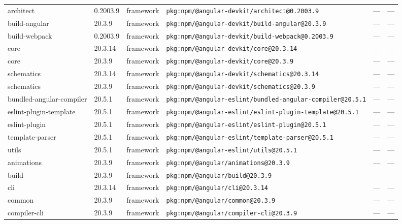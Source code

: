 \documentclass[11pt,a4paper]{article}
\begin{document}
\begin{longtable}{|p{4cm}|p{2cm}|p{1.6cm}|p{5cm}|p{1.5cm}|p{3.5cm}|}
\raggedright architect & 0.2003.9 & framework & \small\texttt{pkg:npm/@angular-devkit/architect@0.2003.9} & — & \small — \\
\raggedright build-angular & 20.3.9 & framework & \small\texttt{pkg:npm/@angular-devkit/build-angular@20.3.9} & — & \small — \\
\raggedright build-webpack & 0.2003.9 & framework & \small\texttt{pkg:npm/@angular-devkit/build-webpack@0.2003.9} & — & \small — \\
\raggedright core & 20.3.14 & framework & \small\texttt{pkg:npm/@angular-devkit/core@20.3.14} & — & \small — \\
\raggedright core & 20.3.9 & framework & \small\texttt{pkg:npm/@angular-devkit/core@20.3.9} & — & \small — \\
\raggedright schematics & 20.3.14 & framework & \small\texttt{pkg:npm/@angular-devkit/schematics@20.3.14} & — & \small — \\
\raggedright schematics & 20.3.9 & framework & \small\texttt{pkg:npm/@angular-devkit/schematics@20.3.9} & — & \small — \\
\raggedright bundled-angular-compiler & 20.5.1 & framework & \small\texttt{pkg:npm/@angular-eslint/bundled-angular-compiler@20.5.1} & — & \small — \\
\raggedright eslint-plugin-template & 20.5.1 & framework & \small\texttt{pkg:npm/@angular-eslint/eslint-plugin-template@20.5.1} & — & \small — \\
\raggedright eslint-plugin & 20.5.1 & framework & \small\texttt{pkg:npm/@angular-eslint/eslint-plugin@20.5.1} & — & \small — \\
\raggedright template-parser & 20.5.1 & framework & \small\texttt{pkg:npm/@angular-eslint/template-parser@20.5.1} & — & \small — \\
\raggedright utils & 20.5.1 & framework & \small\texttt{pkg:npm/@angular-eslint/utils@20.5.1} & — & \small — \\
\raggedright animations & 20.3.9 & framework & \small\texttt{pkg:npm/@angular/animations@20.3.9} & — & \small — \\
\raggedright build & 20.3.9 & framework & \small\texttt{pkg:npm/@angular/build@20.3.9} & — & \small — \\
\raggedright cli & 20.3.14 & framework & \small\texttt{pkg:npm/@angular/cli@20.3.14} & — & \small — \\
\raggedright common & 20.3.9 & framework & \small\texttt{pkg:npm/@angular/common@20.3.9} & — & \small — \\
\raggedright compiler-cli & 20.3.9 & framework & \small\texttt{pkg:npm/@angular/compiler-cli@20.3.9} & — & \small — \\

\end{longtable}
\end{document}
